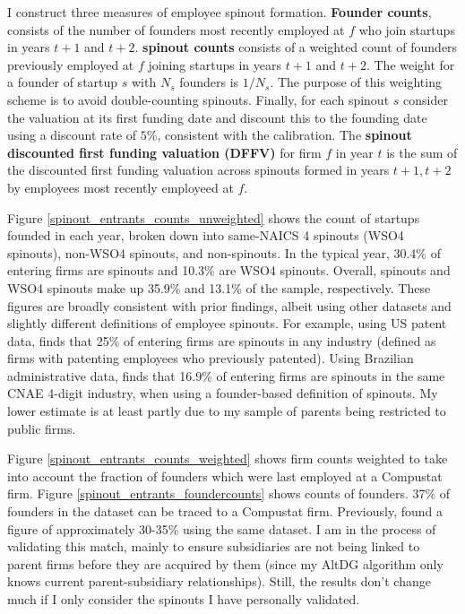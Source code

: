 \documentclass[12pt,english]{article}
\theoremstyle{remark}
\begin{document}
I construct three measures of employee spinout formation. \textbf{Founder counts}, consists of the number of founders most recently employed at $f$ who join startups in years $t+1$ and $t+2$. \textbf{spinout counts} consists of a weighted count of founders previously employed at $f$ joining startups in years $t+1$ and $t+2$. The weight for a founder of startup $s$ with $N_s$ founders is $1/N_s$. The purpose of this weighting scheme is to avoid double-counting spinouts. Finally, for each spinout $s$ consider the valuation at its first funding date and discount this to the founding date using a discount rate of $5\%$, consistent with the calibration. The \textbf{spinout discounted first funding valuation (DFFV)} for firm $f$ in year $t$ is the sum of the discounted first funding valuation across spinouts formed in years $t+1,t+2$ by employees most recently employeed at $f$. 

Figure \ref{spinout_entrants_counts_unweighted} shows the count of startups founded in each year, broken down into same-NAICS 4 spinouts (WSO4 spinouts), non-WSO4 spinouts, and non-spinouts. In the typical year, 30.4\% of entering firms are spinouts and 10.3\% are WSO4 spinouts. Overall, spinouts and WSO4 spinouts make up 35.9\% and 13.1\% of the sample, respectively. These figures are broadly consistent with prior findings, albeit using other datasets and slightly different definitions of employee spinouts. For example, using US patent data, \cite{baslandze_spinout_2019} finds that 25\% of entering firms are spinouts in any industry (defined as firms with patenting employees who previously patented). Using Brazilian administrative data, \cite{muendler_employee_2012} finds that 16.9\% of entering firms are spinouts in the same CNAE 4-digit industry, when using a founder-based definition of spinouts. My lower estimate is at least partly due to my sample of parents being restricted to public firms. 

Figure \ref{spinout_entrants_counts_weighted} shows firm counts weighted to take into account the fraction of founders which were last employed at a Compustat firm. Figure \ref{spinout_entrants_foundercounts} shows counts of founders. 37\% of founders in the dataset can be traced to a Compustat firm. Previously, \cite{gompers_entrepreneurial_2005} found a figure of approximately 30-35\% using the same dataset. I am in the process of validating this match, mainly to ensure subsidiaries are not being linked to parent firms before they are acquired by them (since my AltDG algorithm only knows current parent-subsidiary relationships). Still, the results don't change much if I only consider the spinouts I have personally validated.
\end{document}
